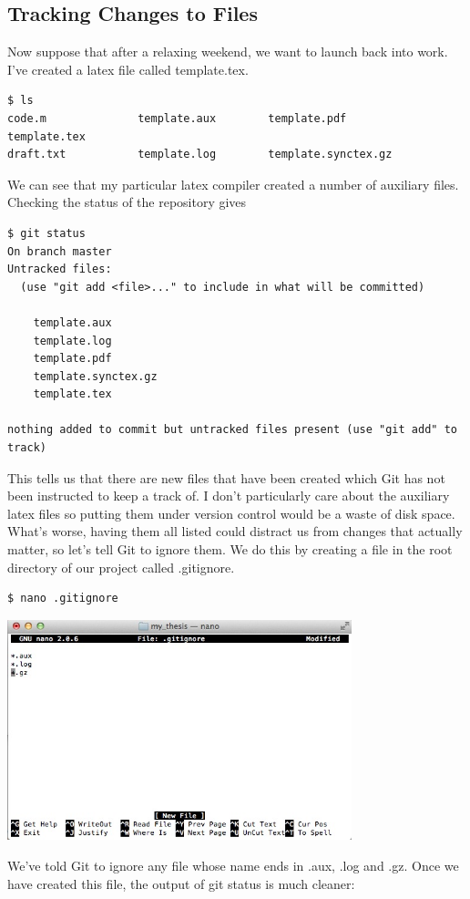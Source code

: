 \documentclass{article}
\begin{document}
\subsection{Tracking Changes to Files}

Now suppose that after a relaxing weekend, we want to launch back into work. I've created a latex file called template.tex.
\begin{lstlisting}
$ ls
code.m              template.aux        template.pdf        template.tex
draft.txt           template.log        template.synctex.gz
\end{lstlisting}
We can see that my particular latex compiler created a number of auxiliary files. Checking the status of the repository gives
\begin{lstlisting}
$ git status
On branch master
Untracked files:
  (use "git add <file>..." to include in what will be committed)

	template.aux
	template.log
	template.pdf
	template.synctex.gz
	template.tex

nothing added to commit but untracked files present (use "git add" to track)
\end{lstlisting}
This tells us that there are new files that have been created which Git has not been instructed to keep a track of. I don't particularly care about the auxiliary latex files so putting them under version control would be a waste of disk space. What's worse, having them all listed could distract us from changes that actually matter, so let's tell Git to ignore them. We do this by creating a file in the root directory of our project called .gitignore.
\begin{lstlisting}
$ nano .gitignore
\end{lstlisting}
\begin{center}
\includegraphics[width=10cm]{./auxfiles/gitignore.jpg}
\end{center}
We've told Git to ignore any file whose name ends in .aux, .log and .gz. Once we have created this file, the output of git status is much cleaner:
\end{document}
